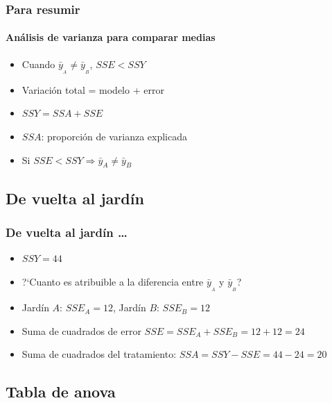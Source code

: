 \documentclass[gray,handout,mathserif]{beamer}
\begin{document}
\begin{frame}[label=anov13]
   \frametitle{Para resumir}
   \framesubtitle{An\'alisis de varianza para comparar medias}
    \begin{itemize}
      \item<1-| visible@1-| handout:1> Cuando $\bar{y}_{_A}\neq \bar{y}_{_B}$, $SSE < SSY$
      \item<2-| visible@2-| handout:1> Variaci\'on total = modelo + error
      \item<3-| visible@3-| handout:1> $SSY = SSA+SSE$
      \item<4-| visible@4-| handout:1> $SSA$: proporci\'on de varianza explicada 
      \item<5-| visible@5-| handout:1> Si $SSE<SSY \Rightarrow \bar{y}_A\neq\bar{y}_B$
   \end{itemize}
\end{frame}%


\subsection[En el jard\'in]{De vuelta al jard\'in}
 
\begin{frame}[label=anov15]
   \frametitle{De vuelta al jard\'in \ldots}
    \begin{itemize}
      \item $SSY=44$
      \item ?`Cuanto es atribuible a la diferencia entre $\bar{y}_{_A}$ y $\bar{y}_{_B}$?
      \item Jard\'in $A$: $SSE_A=12$, Jard\'in $B$: $SSE_B=12$
      \item Suma de cuadrados de error $SSE=SSE_A+SSE_B=12+12=24$
      \item Suma de cuadrados del tratamiento: $SSA=SSY-SSE=44-24=20$
   \end{itemize}
\end{frame}%


\subsection[Tabla de anova]{Tabla de anova}
\end{document}
